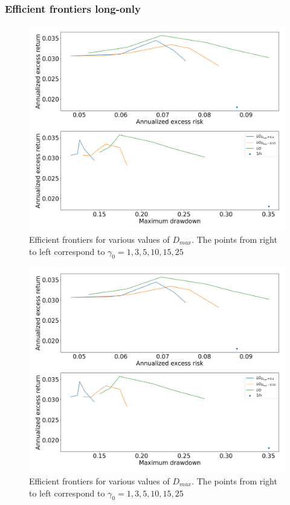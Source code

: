 \subsubsection*{Efficient frontiers long-only}

\begin{figure}[H]
    \centering
    \includegraphics[width=1\textwidth]{analysis/portfolio_exercise/images/mle/frontier_lo.png}
    \caption[Efficient frontiers for various values of $D_{max}$]{Efficient frontiers for various values of $D_{max}$. The points from right to left correspond to $\gamma_0=1,3,5,10,15,25$}
    \label{fig:MPC_frontier_lo}
\end{figure}

\begin{figure}[H]
    \centering
    \includegraphics[width=1\textwidth]{analysis/portfolio_exercise/images/mle/frontier_lo.png}
    \caption[Efficient frontiers for various values of $D_{max}$]{Efficient frontiers for various values of $D_{max}$. The points from right to left correspond to $\gamma_0=1,3,5,10,15,25$}
    \label{fig:MPC_frontier_lo}
\end{figure}

